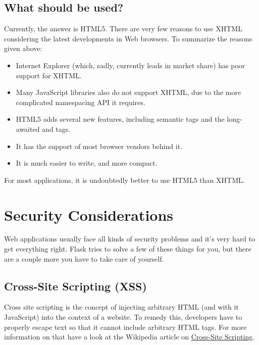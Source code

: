 \documentclass[a4paper,12pt]{sphinxmanual}
\begin{document}
\section{What should be used?}
\label{htmlfaq:what-should-be-used}\label{htmlfaq:dive-into-html5}
Currently, the answer is HTML5.  There are very few reasons to use XHTML
considering the latest developments in Web browsers.  To summarize the
reasons given above:
\begin{itemize}
\item {} 
Internet Explorer (which, sadly, currently leads in market share)
has poor support for XHTML.

\item {} 
Many JavaScript libraries also do not support XHTML, due to the more
complicated namespacing API it requires.

\item {} 
HTML5 adds several new features, including semantic tags and the
long-awaited  and  tags.

\item {} 
It has the support of most browser vendors behind it.

\item {} 
It is much easier to write, and more compact.

\end{itemize}

For most applications, it is undoubtedly better to use HTML5 than XHTML.


\chapter{Security Considerations}
\label{security::doc}\label{security:security-considerations}
Web applications usually face all kinds of security problems and it's very
hard to get everything right.  Flask tries to solve a few of these things
for you, but there are a couple more you have to take care of yourself.


\section{Cross-Site Scripting (XSS)}
\label{security:xss}\label{security:cross-site-scripting-xss}
Cross site scripting is the concept of injecting arbitrary HTML (and with
it JavaScript) into the context of a website.  To remedy this, developers
have to properly escape text so that it cannot include arbitrary HTML
tags.  For more information on that have a look at the Wikipedia article
on \href{http://en.wikipedia.org/wiki/Cross-site\_scripting}{Cross-Site Scripting}.
\end{document}
